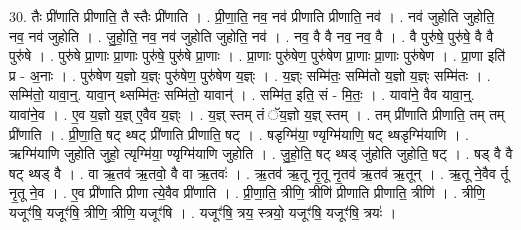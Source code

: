 \documentclass[17pt]{extarticle}
\begin{document}
30. तैः प्री॑णाति प्रीणाति॒ तै स्तैः प्री॑णाति । . प्री॒णा॒ति॒ नव॒ नव॑ प्रीणाति प्रीणाति॒ नव॑ । . नव॑ जुहोति जुहोति॒ नव॒ नव॑ जुहोति । . जु॒हो॒ति॒ नव॒ नव॑ जुहोति जुहोति॒ नव॑ । . नव॒ वै वै नव॒ नव॒ वै । . वै पुरु॑षे॒ पुरु॑षे॒ वै वै पुरु॑षे । . पुरु॑षे प्रा॒णाः प्रा॒णाः पुरु॑षे॒ पुरु॑षे प्रा॒णाः । . प्रा॒णाः पुरु॑षेण॒ पुरु॑षेण प्रा॒णाः प्रा॒णाः पुरु॑षेण । . प्रा॒णा इति॑ प्र - अ॒नाः । . पुरु॑षेण य॒ज्ञो य॒ज्ञ्ः पुरु॑षेण॒ पुरु॑षेण य॒ज्ञ्ः । . य॒ज्ञ्ः सम्मि॑तः॒ सम्मि॑तो य॒ज्ञो य॒ज्ञ्ः सम्मि॑तः । . सम्मि॑तो॒ यावा॒न्॒. यावा॒न् थ्सम्मि॑तः॒ सम्मि॑तो॒ यावान्॑ । . सम्मि॑त॒ इति॒ सं - मि॒तः॒ । . यावा॑ने॒ वैव यावा॒न्॒. यावा॑ने॒व । . ए॒व य॒ज्ञो य॒ज्ञ् ए॒वैव य॒ज्ञ्ः । . य॒ज्ञ् स्तम् तं ॅय॒ज्ञो य॒ज्ञ् स्तम् । . तम् प्री॑णाति प्रीणाति॒ तम् तम् प्री॑णाति । . प्री॒णा॒ति॒ षट् थ्षट् प्री॑णाति प्रीणाति॒ षट् । . षडृग्मि॑या॒ ण्यृग्मि॑याणि॒ षट् थ्षडृग्मि॑याणि । . ऋग्मि॑याणि जुहोति जुहो॒ त्यृग्मि॑या॒ ण्यृग्मि॑याणि जुहोति । . जु॒हो॒ति॒ षट् थ्षड् जु॑होति जुहोति॒ षट् । . षड् वै वै षट् थ्षड् वै । . वा ऋ॒तव॑ ऋ॒तवो॒ वै वा ऋ॒तवः॑ । . ऋ॒तव॑ ऋ॒तू नृ॒तू नृ॒तव॑ ऋ॒तव॑ ऋ॒तून् । . ऋ॒तू ने॒वैव र्तू नृ॒तू ने॒व । . ए॒व प्री॑णाति प्रीणा त्ये॒वैव प्री॑णाति । . प्री॒णा॒ति॒ त्रीणि॒ त्रीणि॑ प्रीणाति प्रीणाति॒ त्रीणि॑ । . त्रीणि॒ यजूꣳ॑षि॒ यजूꣳ॑षि॒ त्रीणि॒ त्रीणि॒ यजूꣳ॑षि । . यजूꣳ॑षि॒ त्रय॒ स्त्रयो॒ यजूꣳ॑षि॒ यजूꣳ॑षि॒ त्रयः॑ । \newline
\end{document}
